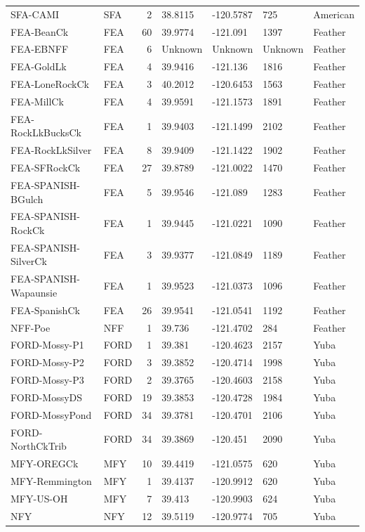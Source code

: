 \documentclass[proquest,12pt,final]{ucthesis-CA2012} %
\begin{document}
\begin{ucmainmatter}
\begin{longtable}[t]{llrllll}
\addlinespace
SFA-CAMI & SFA & 2 & 38.8115 & -120.5787 & 725 & American\\
FEA-BeanCk & FEA & 60 & 39.9774 & -121.091 & 1397 & Feather\\
FEA-EBNFF & FEA & 6 & Unknown & Unknown & Unknown & Feather\\
FEA-GoldLk & FEA & 4 & 39.9416 & -121.136 & 1816 & Feather\\
FEA-LoneRockCk & FEA & 3 & 40.2012 & -120.6453 & 1563 & Feather\\
\addlinespace
FEA-MillCk & FEA & 4 & 39.9591 & -121.1573 & 1891 & Feather\\
FEA-RockLkBucksCk & FEA & 1 & 39.9403 & -121.1499 & 2102 & Feather\\
FEA-RockLkSilver & FEA & 8 & 39.9409 & -121.1422 & 1902 & Feather\\
FEA-SFRockCk & FEA & 27 & 39.8789 & -121.0022 & 1470 & Feather\\
FEA-SPANISH-BGulch & FEA & 5 & 39.9546 & -121.089 & 1283 & Feather\\
\addlinespace
FEA-SPANISH-RockCk & FEA & 1 & 39.9445 & -121.0221 & 1090 & Feather\\
FEA-SPANISH-SilverCk & FEA & 3 & 39.9377 & -121.0849 & 1189 & Feather\\
FEA-SPANISH-Wapaunsie & FEA & 1 & 39.9523 & -121.0373 & 1096 & Feather\\
FEA-SpanishCk & FEA & 26 & 39.9541 & -121.0541 & 1192 & Feather\\
NFF-Poe & NFF & 1 & 39.736 & -121.4702 & 284 & Feather\\
\addlinespace
FORD-Mossy-P1 & FORD & 1 & 39.381 & -120.4623 & 2157 & Yuba\\
FORD-Mossy-P2 & FORD & 3 & 39.3852 & -120.4714 & 1998 & Yuba\\
FORD-Mossy-P3 & FORD & 2 & 39.3765 & -120.4603 & 2158 & Yuba\\
FORD-MossyDS & FORD & 19 & 39.3853 & -120.4728 & 1984 & Yuba\\
FORD-MossyPond & FORD & 34 & 39.3781 & -120.4701 & 2106 & Yuba\\
\addlinespace
FORD-NorthCkTrib & FORD & 34 & 39.3869 & -120.451 & 2090 & Yuba\\
MFY-OREGCk & MFY & 10 & 39.4419 & -121.0575 & 620 & Yuba\\
MFY-Remmington & MFY & 1 & 39.4137 & -120.9912 & 620 & Yuba\\
MFY-US-OH & MFY & 7 & 39.413 & -120.9903 & 624 & Yuba\\
NFY & NFY & 12 & 39.5119 & -120.9774 & 705 & Yuba\\

\end{longtable}
\end{ucmainmatter}
\end{document}
